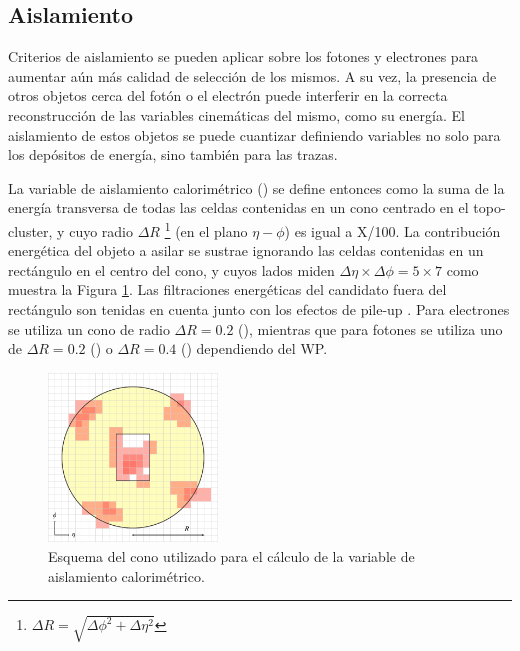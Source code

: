 \subsection{Aislamiento}

Criterios de aislamiento se pueden aplicar sobre los fotones y electrones para aumentar aún más calidad de selección de los mismos. A su vez, la presencia de otros objetos cerca del fotón o el electrón puede interferir en la correcta reconstrucción de las variables cinemáticas del mismo, como su energía. El aislamiento de estos objetos se puede cuantizar definiendo variables no solo para los depósitos de energía, sino también para las trazas.

La variable de aislamiento calorimétrico \cite{PERF-2017-01} () se define entonces como la suma de la energía transversa de todas las celdas contenidas en un cono centrado en el topo-cluster, y cuyo radio $\Delta R$ \footnote{$\Delta R=\sqrt{\Delta\phi^2+\Delta\eta^2}$} (en el plano $\eta-\phi$) es igual a X/100. La contribución energética del objeto a asilar se sustrae ignorando las celdas contenidas en un rectángulo en el centro del cono, y cuyos lados miden $\Delta\eta\times\Delta\phi = 5 \times 7$ como muestra la Figura \ref{fig:IDcone}. Las filtraciones energéticas del candidato fuera del rectángulo son tenidas en cuenta junto con los efectos de pile-up \cite{Cacciari}. Para electrones se utiliza un cono de radio $\Delta R = 0.2$ (), mientras que para fotones se utiliza uno de $\Delta R = 0.2$ () o $\Delta R = 0.4$ () dependiendo del WP.


\begin{figure}
\centering
  \includegraphics[width=0.4\textwidth]{images/objects/iso.pdf}
\caption{Esquema del cono utilizado para el cálculo de la variable de aislamiento calorimétrico.}
  \label{fig:IDcone}
\end{figure}


